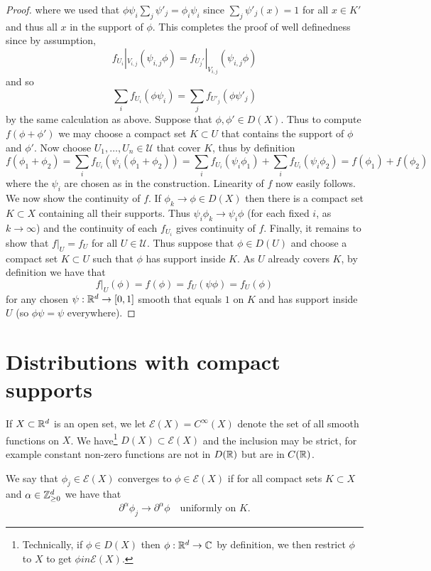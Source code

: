 \documentclass[twoside, a4paper, 10pt]{amsart}
\begin{document}
\begin{proof}
where we used that $\phi \psi_i \sum_j \psi'_j = \phi_i\psi_i$ since $\sum_j \psi'_j(x) = 1$ for all $x \in K'$ and thus all $x$ in the support of $\phi$. This completes the proof of well definedness since by assumption, $$f_{U_i}|_{V_{i,j}}(\psi_{i,j}\phi) = f_{U_j'}|_{V_{i,j}}(\psi_{i,j}\phi)$$ and so  $$\sum_i f_{U_i}(\phi \psi_i) = \sum_j f_{U'_j}(\phi \psi'_j)$$ by the same calculation as above. Suppose that $\phi, \phi' \in D(X)$. Thus to compute $f(\phi + \phi')$ we may choose a compact set $K \subset U$ that contains the support of $\phi$ and $\phi'$. Now choose $U_1, \ldots, U_n \in \mathcal{U}$ that cover $K$, thus by definition $$f(\phi_1 + \phi_2) = \sum_{i} f_{U_i} (\psi_i (\phi_1 + \phi_2)) = \sum_i f_{U_i}(\psi_i \phi_1) + \sum_i f_{U_i}(\psi_i \phi_2) = f(\phi_1) + f(\phi_2)$$ where the $\psi_i$ are chosen as in the construction. Linearity of $f$ now easily follows. We now show the continuity of $f$. If $\phi_k \to \phi \in D(X)$ then there is a compact set $K \subset X$ containing all their supports. Thus $\psi_i \phi_k \to \psi_i \phi$ (for each fixed $i$, as $k \to \infty$) and the continuity of each $f_{U_i}$ gives continuity of $f$. Finally, it remains to show that $f|_{U} = f_{U}$ for all $U \in \mathcal{U}$. Thus suppose that $\phi \in D(U)$ and choose a compact set $K \subset U$ such that $\phi$ has support inside $K$. As $U$ already covers $K$, by definition we have that $$f|_U(\phi) = f(\phi) =  f_U(\psi \phi) = f_U(\phi)$$ for any chosen $\psi:\mathbb{R}^d \to [0,1]$ smooth that equals $1$ on $K$ and has support inside $U$ (so $\phi\psi = \psi$ everywhere). \end{proof}

\section{Distributions with compact supports}

If $X \subset \mathbb{R}^d$ is an open set, we let $\mathcal{E}(X) = C^{\infty}(X)$ denote the set of all smooth functions on $X$. We have\footnote{Technically, if $\phi \in D(X)$ then $\phi:\mathbb{R}^d \to \mathbb{C}$ by definition, we then restrict $\phi$ to $X$ to get $\phi in \mathcal{E}(X)$.} $D(X) \subset \mathcal{E}(X)$ and the inclusion may be strict, for example constant non-zero functions are not in $D(\mathbb{R})$ but are in $C(\mathbb{R})$.

\begin{mydef} We say that $\phi_j \in \mathcal{E}(X)$ converges to $\phi \in \mathcal{E}(X)$ if for all compact sets $K \subset X$ and $\alpha \in \mathbb{Z}_{\geq 0}^d$ we have that $$\partial^{\alpha}\phi_j \to \partial^{\alpha}\phi \quad \text{uniformly on } K. $$

\end{mydef}
\end{document}
